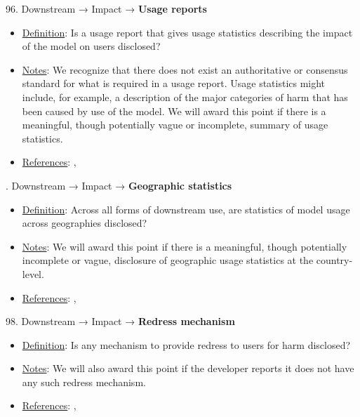 96. Downstream → Impact → \textbf{Usage reports}
\vspace{-\parskip}
\begin{itemize}
	\item
	\underline{Definition}: Is a usage report that gives usage statistics describing the impact of the model on users disclosed?
	\item
	\underline{Notes}: We recognize that there does not exist an authoritative or consensus standard for what is required in a usage report. Usage statistics might include, for example, a description of the major categories of harm that has been caused by use of the model. We will award this point if there is a meaningful, though potentially vague or incomplete, summary of usage statistics.
	\item
	\underline{References}: \citet{brown2023allocating}, \citet{bommasani2023ecosystem}
\end{itemize} \vspace{\baselineskip}


. Downstream → Impact → \textbf{Geographic statistics}
\vspace{-\parskip}
\begin{itemize}
	\item
	\underline{Definition}: Across all forms of downstream use, are statistics of model usage across geographies disclosed?
	\item
	\underline{Notes}: We will award this point if there is a meaningful, though potentially incomplete or vague, disclosure of geographic usage statistics at the country-level.
	\item
	\underline{References}: \citet{brown2023allocating}, \citet{bommasani2023ecosystem}
\end{itemize} \vspace{\baselineskip}


98. Downstream → Impact → \textbf{Redress mechanism}
\vspace{-\parskip}
\begin{itemize}
	\item
	\underline{Definition}: Is any mechanism to provide redress to users for harm disclosed?
	\item
	\underline{Notes}: We will also award this point if the developer reports it does not have any such redress mechanism.
	\item
	\underline{References}: \citet{vipra2023}, \citet{bommasani2023ecosystem}
\end{itemize} \vspace{\baselineskip}


